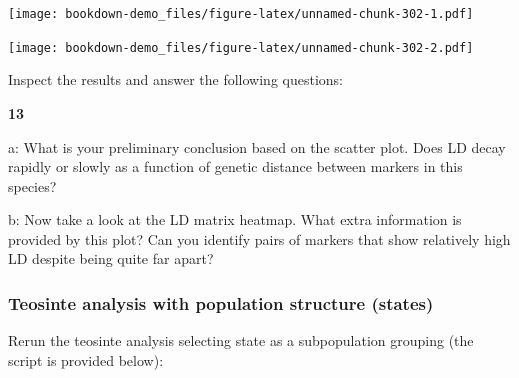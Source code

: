 \documentclass[
]{book}
\makeatletter
\newenvironment{Shaded}{\begin{snugshade}}{\end{snugshade}}
\newcommand{\AttributeTok}[1]{\textcolor[rgb]{0.77,0.63,0.00}{#1}}
\newcommand{\DecValTok}[1]{\textcolor[rgb]{0.00,0.00,0.81}{#1}}
\newcommand{\FloatTok}[1]{\textcolor[rgb]{0.00,0.00,0.81}{#1}}
\newcommand{\FunctionTok}[1]{\textcolor[rgb]{0.00,0.00,0.00}{#1}}
\newcommand{\NormalTok}[1]{#1}
\newcommand{\OtherTok}[1]{\textcolor[rgb]{0.56,0.35,0.01}{#1}}
\newcommand{\SpecialCharTok}[1]{\textcolor[rgb]{0.00,0.00,0.00}{#1}}
\newcommand{\StringTok}[1]{\textcolor[rgb]{0.31,0.60,0.02}{#1}}
\newenvironment{kframe}{%
\medskip{}
\setlength{\fboxsep}{.8em}
 \def\at@end@of@kframe{}%
 \ifinner\ifhmode%
  \def\at@end@of@kframe{\end{minipage}}%
  \begin{minipage}{\columnwidth}%
 \fi\fi%
 \def\FrameCommand##1{\hskip\@totalleftmargin \hskip-\fboxsep
 \colorbox{shadecolor}{##1}\hskip-\fboxsep
     \hskip-\linewidth \hskip-\@totalleftmargin \hskip\columnwidth}%
 \MakeFramed {\advance\hsize-\width
   \@totalleftmargin\z@ \linewidth\hsize
   \@setminipage}}%
 {\par\unskip\endMakeFramed%
 \at@end@of@kframe}
\newenvironment{rmdblock}[1]
  {
  \begin{itemize}
  \renewcommand{\labelitemi}{
    \raisebox{-.7\height}[0pt][0pt]{
      {\setkeys{Gin}{width=3em,keepaspectratio}\texttt{[image: images/\#1]}}
    }
  }
  \setlength{\fboxsep}{1em}
  \begin{kframe}
  \item
  }
  {
  \end{kframe}
  \end{itemize}
  }
\newenvironment{rmdquiz}
  {\begin{rmdblock}{quiz}}
  {\end{rmdblock}}
\makeatother
\begin{document}
\texttt{[image: bookdown-demo\_files/figure-latex/unnamed-chunk-302-1.pdf]}

\begin{Shaded}
\end{Shaded}

\texttt{[image: bookdown-demo\_files/figure-latex/unnamed-chunk-302-2.pdf]}

Inspect the results and answer the following questions:

\begin{rmdquiz}
\textbf{13}

a: What is your preliminary conclusion based on the scatter plot. Does LD decay rapidly or slowly as a function of genetic distance between markers in this species?

b: Now take a look at the LD matrix heatmap. What extra information is provided by this plot? Can you identify pairs of markers that show relatively high LD despite being quite far apart?
\end{rmdquiz}

\hypertarget{teosinte-analysis-with-population-structure-states}{%
\subsubsection{Teosinte analysis with population structure (states)}\label{teosinte-analysis-with-population-structure-states}}

Rerun the teosinte analysis selecting state as a subpopulation grouping (the script is provided below):
\end{document}
